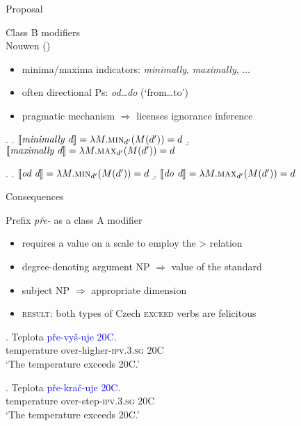 \documentclass[12pt]{beamer}
\begin{document}
\begin{frame}{Proposal}

Class B modifiers\\
\scriptsize Nouwen (\citeyear{nouwen2010two})\normalsize

\begin{itemize}
\item minima/maxima indicators: \textit{minimally}, \textit{maximally}, ...
\item often directional Ps: \textit{od}\dots \textit{do} (`from\dots to')
\item pragmatic mechanism $\Rightarrow$ licenses ignorance inference
\end{itemize}

\ex. \a. $\llbracket\textit{minimally~d}\rrbracket=\lambda M.\textsc{min}_{d'}(M(d'))=d$
\b. $\llbracket\textit{maximally~d}\rrbracket=\lambda M.\textsc{max}_{d'}(M(d'))=d$

\ex. \a. $\llbracket\textit{od~d}\rrbracket=\lambda M.\textsc{min}_{d'}(M(d'))=d$
\b. $\llbracket\textit{do~d}\rrbracket=\lambda M.\textsc{max}_{d'}(M(d'))=d$

\end{frame}

\begin{frame}{Consequences}

Prefix \textit{pře-} as a class A modifier 

\begin{itemize}
\item requires a value on a scale to employ the > relation
\item degree-denoting argument NP $\Rightarrow$ value of the standard  
\item subject NP $\Rightarrow$ appropriate dimension  
\item \textsc{result}: both types of Czech \textsc{exceed} verbs are felicitous
\end{itemize}

\exg. Teplota \textcolor{blue}{pře-vyš-uje} \textcolor{blue}{20\degree C}.\label{ex:ExVs-degrees}\\
temperature over-higher-\textsc{ipv.3.sg} 20\degree C\\
`The temperature exceeds 20\degree C.'

\exg. Teplota \textcolor{blue}{pře-krač-uje} \textcolor{blue}{20\degree C}.\\
temperature over-step-\textsc{ipv.3.sg} 20\degree C\\
`The temperature exceeds 20\degree C.'

\end{frame}
\end{document}

